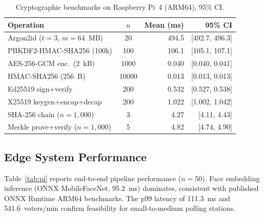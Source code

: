 \documentclass[conference]{IEEEtran}
\begin{document}
\begin{table}[t]
\centering
\caption{Cryptographic benchmarks on Raspberry Pi~4 (ARM64), 95\% CI.}
\label{tab:crypto}
\begin{tabular}{lcrr}
  \toprule
  Operation & \(n\) & Mean (ms) & 95\% CI \\
  \midrule
  Argon2id (\(t{=}3\), \(m{=}64\)~MB) & 20    & 494.5 & [492.7, 496.3] \\
  PBKDF2-HMAC-SHA256 (100k)            & 100   & 106.1 & [105.1, 107.1] \\
  AES-256-GCM enc.\ (2~kB)            & 1000  & 0.040 & [0.040, 0.041] \\
  HMAC-SHA256 (256~B)                  & 10000 & 0.013 & [0.013, 0.013] \\
  Ed25519 sign+verify                  & 200   & 0.532 & [0.527, 0.538] \\
  X25519 keygen+encap+decap            & 200   & 1.022 & [1.002, 1.042] \\
  SHA-256 chain (\(n{=}1{,}000\))     & 3     & 4.27  & [4.11, 4.43]   \\
  Merkle prove+verify (\(n{=}1{,}000\))& 5    & 4.82  & [4.74, 4.90]   \\
  \bottomrule
\end{tabular}
\end{table}

\subsection{Edge System Performance}

Table~\ref{tab:pi} reports end-to-end pipeline performance (\(n{=}50\)).
Face embedding inference (ONNX MobileFaceNet, 95.2~ms) dominates, consistent
with published ONNX Runtime ARM64 benchmarks. The p99 latency of 111.3~ms
and 541.6~voters/min confirm feasibility for small-to-medium polling stations.
\end{document}

